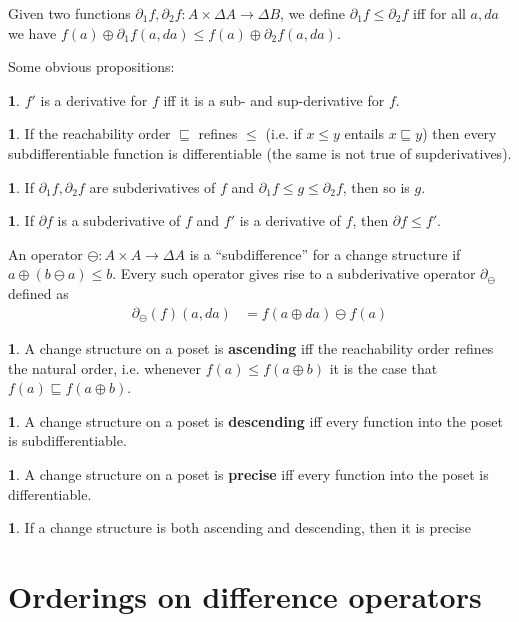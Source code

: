 \documentclass[english]{article}
\newcommand{\als}[1]{\begin{align*} #1 \end{align*}}
\theoremstyle{plain}
\theoremstyle{remark}
\theoremstyle{remark}
\theoremstyle{remark}
\theoremstyle{definition}
\newtheorem{defn}[thm]{\protect\definitionname}
\theoremstyle{definition}
\newtheorem{prop}[thm]{\protect\propositionname}
\newcommand{\ra}[0]{\rightarrow}
\providecommand{\definitionname}{Definition}
\providecommand{\propositionname}{Proposition}
\begin{document}
Given two functions $\partial_1 f, \partial_2 f : A \times \Delta A \ra \Delta B$, we define
$\partial_1 f \leq \partial_2 f$ iff for all $a, da$ we have $f(a) \oplus \partial_1f(a, da)
\leq f(a) \oplus \partial_2f(a, da)$.

Some obvious propositions:
\begin{prop}
  $f'$ is a derivative for $f$ iff it is a sub- and sup-derivative for $f$.
\end{prop}
\begin{prop}
  If the reachability order $\sqsubseteq$ refines $\leq$ (i.e. if $x \leq y$ entails
  $x \sqsubseteq y$) then every subdifferentiable function is differentiable (the same is
  not true of supderivatives).
\end{prop}
\begin{prop}
  If $\partial_1 f, \partial_2 f$ are subderivatives of $f$ and $\partial_1 f \leq g \leq
  \partial_2 f$, then so is $g$.
\end{prop}
\begin{prop}
  If $\partial f$ is a subderivative of $f$ and $f'$ is a derivative of $f$, then
  $\partial f \leq f'$.
\end{prop}

An operator $\ominus : A \times A \ra \Delta A$ is a ``subdifference'' for a change structure
if $a \oplus (b \ominus a) \leq b$. Every such operator gives rise to a subderivative operator
$\partial_\ominus$ defined as \als{
  \partial_\ominus (f)(a, da) &= f(a \oplus da) \ominus f(a)
}

\begin{defn}
  A change structure on a poset is \textbf{ascending} iff the reachability order refines the natural
  order, i.e. whenever $f(a) \leq f(a \oplus b)$ it is the case that
  $f(a) \sqsubseteq f(a \oplus b)$.
\end{defn}
\begin{defn}
  A change structure on a poset is \textbf{descending} iff every function into the poset is
  subdifferentiable.
\end{defn}
\begin{defn}
  A change structure on a poset is \textbf{precise} iff every function into the poset is
  differentiable.
\end{defn}

\begin{prop}
  If a change structure is both ascending and descending, then it is precise
\end{prop}

\section{Orderings on difference operators}
\end{document}
